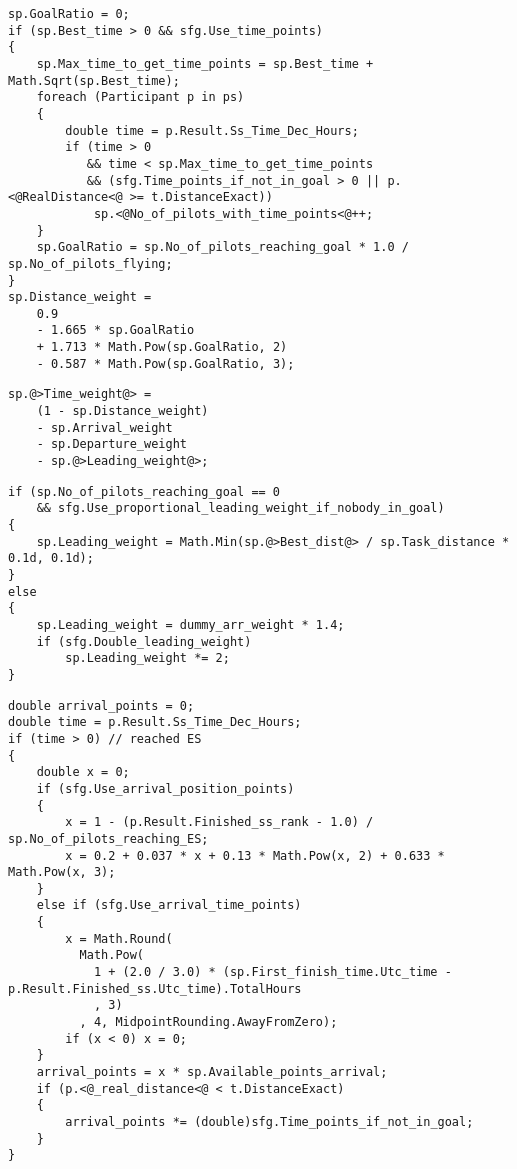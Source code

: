 \documentclass[gap.tex]{subfiles}
\begin{document}
\begin{lstlisting}[style=base, caption={Distance weight doesn't depend on distance inputs.}]
sp.GoalRatio = 0;
if (sp.Best_time > 0 && sfg.Use_time_points)
{
    sp.Max_time_to_get_time_points = sp.Best_time + Math.Sqrt(sp.Best_time);
    foreach (Participant p in ps)
    {
        double time = p.Result.Ss_Time_Dec_Hours;
        if (time > 0
           && time < sp.Max_time_to_get_time_points
           && (sfg.Time_points_if_not_in_goal > 0 || p.<@RealDistance<@ >= t.DistanceExact))
            sp.<@No_of_pilots_with_time_points<@++;
    }
    sp.GoalRatio = sp.No_of_pilots_reaching_goal * 1.0 / sp.No_of_pilots_flying;
}
sp.Distance_weight =
    0.9
    - 1.665 * sp.GoalRatio
    + 1.713 * Math.Pow(sp.GoalRatio, 2)
    - 0.587 * Math.Pow(sp.GoalRatio, 3);
\end{lstlisting}

\begin{lstlisting}[style=base, caption={Time weight depends on \textcolor{red}{bonus} distance.}]
sp.@>Time_weight@> =
    (1 - sp.Distance_weight)
    - sp.Arrival_weight
    - sp.Departure_weight
    - sp.@>Leading_weight@>;
\end{lstlisting}

\begin{lstlisting}[style=base, caption={Leading weight depends on \textcolor{red}{bonus} distance.}]
if (sp.No_of_pilots_reaching_goal == 0
    && sfg.Use_proportional_leading_weight_if_nobody_in_goal)
{
    sp.Leading_weight = Math.Min(sp.@>Best_dist@> / sp.Task_distance * 0.1d, 0.1d);
}
else
{
    sp.Leading_weight = dummy_arr_weight * 1.4;
    if (sfg.Double_leading_weight)
        sp.Leading_weight *= 2;
}
\end{lstlisting}

\begin{lstlisting}[style=base, caption={Arrival point allocation depends on \textcolor{blue}{real} distance.}]
double arrival_points = 0;
double time = p.Result.Ss_Time_Dec_Hours;
if (time > 0) // reached ES
{
    double x = 0;
    if (sfg.Use_arrival_position_points)
    {
        x = 1 - (p.Result.Finished_ss_rank - 1.0) / sp.No_of_pilots_reaching_ES;
        x = 0.2 + 0.037 * x + 0.13 * Math.Pow(x, 2) + 0.633 * Math.Pow(x, 3);
    }
    else if (sfg.Use_arrival_time_points)
    {
        x = Math.Round(
          Math.Pow(
            1 + (2.0 / 3.0) * (sp.First_finish_time.Utc_time - p.Result.Finished_ss.Utc_time).TotalHours
            , 3)
          , 4, MidpointRounding.AwayFromZero);
        if (x < 0) x = 0;
    }
    arrival_points = x * sp.Available_points_arrival;
    if (p.<@_real_distance<@ < t.DistanceExact)
    {
        arrival_points *= (double)sfg.Time_points_if_not_in_goal;
    }
}
\end{lstlisting}
\end{document}

